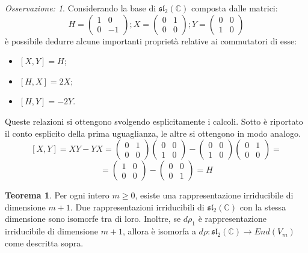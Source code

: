 \documentclass[12pt,a4paper]{report}
\theoremstyle{definition}
\newtheorem{Theo}[Def]{Teorema}
\theoremstyle{definition}
\theoremstyle{definition}
\theoremstyle{remark}
\newtheorem{Obs}[Def]{Osservazione:}
\begin{document}
\begin{Obs}\label{Obs1}
	Considerando la base di $\mathfrak{sl_2(\mathbb{C})}$ composta dalle matrici: $$H=
	\begin{pmatrix}
		1&0\\
		0&-1
	\end{pmatrix}; 
	X=\begin{pmatrix}
		0&1\\
		0&0
	\end{pmatrix};
	Y=\begin{pmatrix}
		0&0\\
		1&0
	\end{pmatrix}$$
è possibile dedurre alcune importanti proprietà relative ai commutatori di esse:
\begin{itemize}
	\item $[X,Y]=H$;
	\item $[H,X]=2X$;
	\item $[H,Y]=-2Y$.
\end{itemize}
Queste relazioni si ottengono svolgendo esplicitamente i calcoli. Sotto è riportato il conto esplicito della prima uguaglianza, le altre si ottengono in modo analogo.
$$[X,Y]=XY-YX=\begin{pmatrix}
	0&1\\
	0&0
\end{pmatrix}
\begin{pmatrix}
	0&0\\
	1&0
\end{pmatrix}-
\begin{pmatrix}
	0&0\\
	1&0
\end{pmatrix}
\begin{pmatrix}
	0&1\\
	0&0
\end{pmatrix}=$$$$=
\begin{pmatrix}
1&0\\
0&0
\end{pmatrix}-\begin{pmatrix}
0&0\\
0&1
\end{pmatrix}=H$$
\end{Obs}
\begin{Theo}\label{Theo2}
	Per ogni intero $m\geq 0$, esiste una rappresentazione irriducibile di dimensione $m+1$. Due rappresentazioni irriducibili di $\mathfrak{sl_2(\mathbb{C})}$ con la stessa dimensione sono isomorfe tra di loro. Inoltre, se $d\rho_1$ è rappresentazione irriducibile di dimensione $m+1$, allora è isomorfa a $d\rho:\mathfrak{sl_2(\mathbb{C})}\rightarrow End(V_m)$ come descritta sopra.
\end{Theo}
\end{document}
